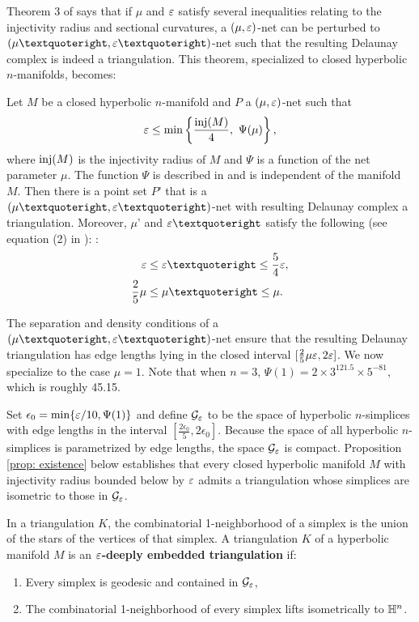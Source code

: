 Theorem 3 of \cite{Bois} says that if $\mu$ and $\varepsilon$ satisfy several inequalities relating to the injectivity radius and sectional curvatures, a $(\mu,\varepsilon)$-net can be perturbed to $(\mu’,\e’)$-net such that the resulting Delaunay complex is indeed a triangulation. This theorem, specialized to closed hyperbolic $n$-manifolds, becomes:
\begin{thm}

\cite{Bois} Let $M$ be a closed hyperbolic $n$-manifold and $P$ a $(\mu,\varepsilon)$-net such that \[\varepsilon \leq \min\left\{\frac{\operatorname{inj}(M)}{4},~\Psi(\mu)\right\},\] where $\operatorname{inj}(M)$ is the injectivity radius of $M$ and $\Psi$ is a function of the net parameter $\mu$. The function $\Psi$ is described in \cite{Bois} and is independent of the manifold $M$. Then there is a point set $P’$ that is a $(\mu’,\e’)$-net with resulting Delaunay complex a triangulation. Moreover, $\mu’$ and $\e’$ satisfy the following (see equation (2) in \cite{Bois}):
: \begin{align*}
     \e &\leq \e’ \leq \frac{5}{4}\e, \\
    \frac{2}{5}\mu &\leq \mu’ \leq \mu.
\end{align*}
\end{thm}

The separation and density conditions of a $(\mu’,\e’)$-net ensure that the resulting Delaunay triangulation has edge lengths lying in the closed interval $[\frac{2}{5}\mu \varepsilon ,2\varepsilon]$. We now specialize to the case $\mu=1$. Note that when $n=3$, $\Psi(1) = 2\times 3^{121.5}\times 5^{-81}$, which is roughly 45.15.

Set $\epsilon_0 = \min\{\varepsilon/10,\Psi(1)\}$ and define $\mathcal{G}_{\varepsilon}$ to be the space of hyperbolic $n$-simplices with edge lengths in the interval $[\frac{2\epsilon_0}{5} ,2\epsilon_0]$. Because the space of all hyperbolic $n$-simplices is parametrized by edge lengths, the space $\mathcal{G}_{\varepsilon}$ is compact. Proposition \ref{prop: existence} below establishes that every closed hyperbolic manifold $M$ with injectivity radius bounded below by $\varepsilon$ admits a triangulation whose simplices are isometric to those in $\mathcal{G}_\varepsilon$.

In a triangulation $K$, the combinatorial 1-neighborhood of a simplex is the union of the stars of the vertices of that simplex. A triangulation $K$ of a hyperbolic manifold $M$ is an \textbf{$\varepsilon$-deeply embedded triangulation} if:

\begin{enumerate}
    \item Every simplex is geodesic and contained in $\mathcal G_\varepsilon$,
    \item The combinatorial 1-neighborhood of every simplex lifts isometrically to $\mathbb H^n$.
\end{enumerate}

